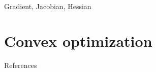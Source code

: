 \documentclass{beamer}
\numberwithin{equation}{section}
\begin{document}
\begin{frame}{Gradient, Jacobian, Hessian}
    
\end{frame}

\section{Convex optimization}

\begin{frame}{References}
    
    
\end{frame}
\end{document}
